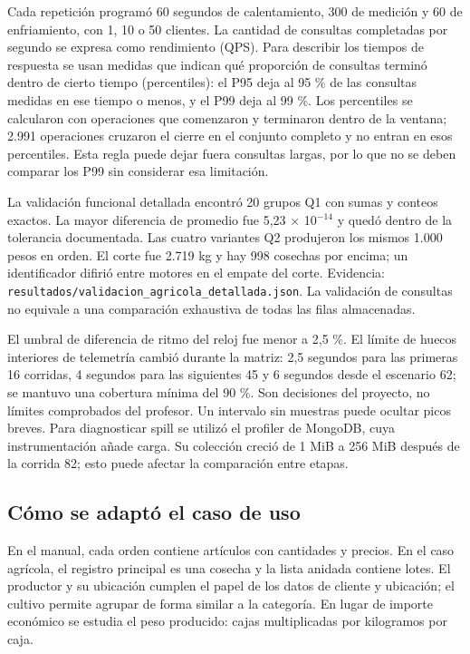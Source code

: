 \documentclass[12pt,letterpaper]{article}
\begin{document}
Cada repetición programó 60 segundos de calentamiento, 300 de medición y 60 de enfriamiento, con 1, 10 o 50 clientes. La cantidad de consultas completadas por segundo se expresa como rendimiento (QPS). Para describir los tiempos de respuesta se usan medidas que indican qué proporción de consultas terminó dentro de cierto tiempo (percentiles): el P95 deja al 95 \% de las consultas medidas en ese tiempo o menos, y el P99 deja al 99 \%. Los percentiles se calcularon con operaciones que comenzaron y terminaron dentro de la ventana; 2.991 operaciones cruzaron el cierre en el conjunto completo y no entran en esos percentiles. Esta regla puede dejar fuera consultas largas, por lo que no se deben comparar los P99 sin considerar esa limitación.

La validación funcional detallada encontró 20 grupos Q1 con sumas y conteos exactos. La mayor diferencia de promedio fue 5,23 × 10$^{-14}$ y quedó dentro de la tolerancia documentada. Las cuatro variantes Q2 produjeron los mismos 1.000 pesos en orden. El corte fue 2.719 kg y hay 998 cosechas por encima; un identificador difirió entre motores en el empate del corte. Evidencia: \texttt{resultados/\allowbreak{}validacion\_\allowbreak{}agricola\_\allowbreak{}detallada.json}. La validación de consultas no equivale a una comparación exhaustiva de todas las filas almacenadas.

El umbral de diferencia de ritmo del reloj fue menor a 2,5 \%. El límite de huecos interiores de telemetría cambió durante la matriz: 2,5 segundos para las primeras 16 corridas, 4 segundos para las siguientes 45 y 6 segundos desde el escenario 62; se mantuvo una cobertura mínima del 90 \%. Son decisiones del proyecto, no límites comprobados del profesor. Un intervalo sin muestras puede ocultar picos breves. Para diagnosticar spill se utilizó el profiler de MongoDB, cuya instrumentación añade carga. Su colección creció de 1 MiB a 256 MiB después de la corrida 82; esto puede afectar la comparación entre etapas.


\subsection*{Cómo se adaptó el caso de uso}
En el manual, cada orden contiene artículos con cantidades y precios. En el caso agrícola, el registro principal es una cosecha y la lista anidada contiene lotes. El productor y su ubicación cumplen el papel de los datos de cliente y ubicación; el cultivo permite agrupar de forma similar a la categoría. En lugar de importe económico se estudia el peso producido: cajas multiplicadas por kilogramos por caja.
\end{document}
